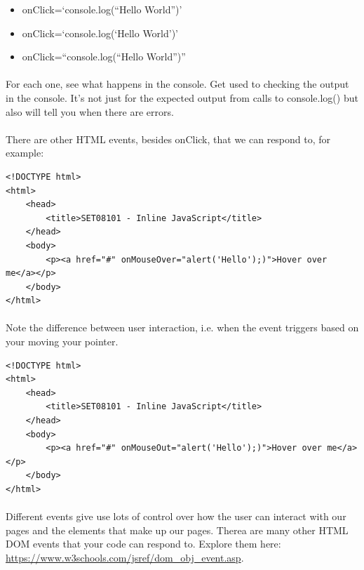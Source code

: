 \documentclass[10pt, a4paper, twosize]{article}
\begin{document}
\begin{itemize}
\item onClick=`console.log(``Hello World'')'
\item onClick=`console.log(`Hello World')'
\item onClick=``console.log(``Hello World'')''
\end{itemize}

\paragraph{} For each one, see what happens in the console. Get used to checking the output in the console. It's not just for the expected output from calls to console.log() but also will tell you when there are errors.

\paragraph{} There are other HTML events, besides onClick, that we can respond to, for example:

\begin{lstlisting}
<!DOCTYPE html>
<html>
    <head>
        <title>SET08101 - Inline JavaScript</title>
    </head>
    <body>
        <p><a href="#" onMouseOver="alert('Hello');)">Hover over me</a></p> 
    </body>
</html>
\end{lstlisting}

\paragraph{} Note the difference between user interaction, i.e. when the event triggers based on your moving your pointer.

\begin{lstlisting}
<!DOCTYPE html>
<html>
    <head>
        <title>SET08101 - Inline JavaScript</title>
    </head>
    <body>
        <p><a href="#" onMouseOut="alert('Hello');)">Hover over me</a></p> 
    </body>
</html>
\end{lstlisting}

\paragraph{} Different events give use lots of control over how the user can interact with our pages and the elements that make up our pages. Therea are many other HTML DOM events that your code can respond to. Explore them here: \url{https://www.w3schools.com/jsref/dom_obj_event.asp}.
\end{document}
